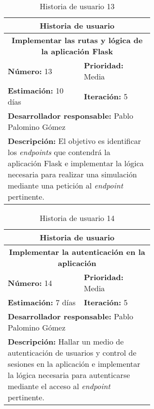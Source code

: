 \begin{table}[H]
        \centering
        \begin{tabular}{|p{0.3\linewidth}|p{0.3\linewidth}|}
          \hline
          \multicolumn{2}{|c|}{Historia de usuario}\\ \hline
          \multicolumn{2}{|c|}{\textbf{Implementar las rutas y lógica de la aplicación Flask}}\\ \hline
          \textbf{Número:} 13 & \textbf{Prioridad:} Media\\ \hline
          \textbf{Estimación:} 10 días & \textbf{Iteración:} 5\\ \hline
          \multicolumn{2}{|l|}{\textbf{Desarrollador responsable:} Pablo Palomino Gómez}\\ \hline
          \multicolumn{2}{|p{0.6\linewidth}|}{\textbf{Descripción:} El objetivo es identificar los \textit{endpoints} que contendrá la aplicación Flask e implementar la lógica necesaria para realizar una simulación mediante una petición al \textit{endpoint} pertinente.}\\ \hline
        \end{tabular}
        \caption{Historia de usuario 13}
        \label{tab:hist13}
\end{table}
\begin{table}[H]
        \centering
        \begin{tabular}{|p{0.3\linewidth}|p{0.3\linewidth}|}
          \hline
          \multicolumn{2}{|c|}{Historia de usuario}\\ \hline
          \multicolumn{2}{|c|}{\textbf{Implementar la autenticación en la aplicación}}\\ \hline
          \textbf{Número:} 14 & \textbf{Prioridad:} Media\\ \hline
          \textbf{Estimación:} 7 días & \textbf{Iteración:} 5\\ \hline
          \multicolumn{2}{|l|}{\textbf{Desarrollador responsable:} Pablo Palomino Gómez}\\ \hline
          \multicolumn{2}{|p{0.6\linewidth}|}{\textbf{Descripción:} Hallar un medio de autenticación de usuarios y control de sesiones en la aplicación e implementar la lógica necesaria para autenticarse mediante el acceso al \textit{endpoint} pertinente.}\\ \hline
        \end{tabular}
        \caption{Historia de usuario 14}
        \label{tab:hist14}
\end{table}
